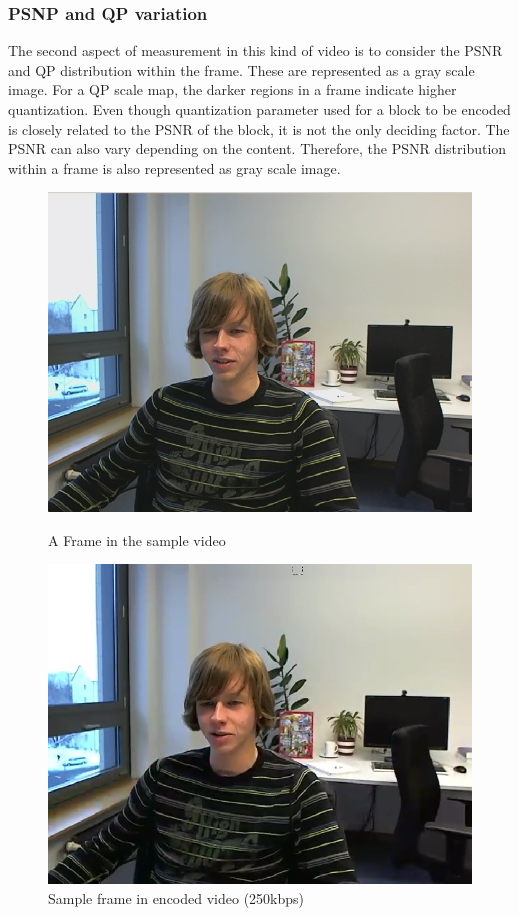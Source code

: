 \documentclass[11pt]{article} %
\begin{document}
\subsubsection{PSNP and QP variation}
The second aspect of measurement in this kind of video is to consider the PSNR and QP distribution within the frame. These are represented as a gray scale image. For a QP scale map, the darker regions in a frame indicate higher quantization. Even though quantization parameter used for a block to be encoded is closely related to the PSNR of the block, it is not the only deciding factor. The PSNR can also vary depending on the content. Therefore, the PSNR distribution within a frame is also represented as gray scale image.
\begin{figure}[!h]
    \centering
    \includegraphics[scale=0.5]{PaulDefault120}
    \caption{A Frame in the sample video}
    \label{fig:PaulDefault120}
    \includegraphics[scale=0.5]{PaulDefault120_91250kbps}
    \caption{Sample frame in encoded video (250kbps)}
    \label{fig:PaulDefaultencoded}
\end{figure} 
\end{document}
